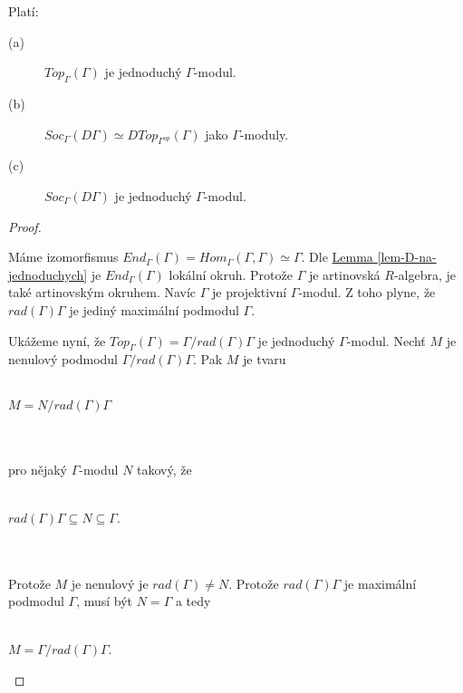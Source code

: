      \begin{lem}\label{lem-soc-top}
       Platí:
       \begin{description}
         \item[(a)] $Top_\Gamma(\Gamma)$ je jednoduchý $\Gamma$-modul. 
         \item[(b)] $Soc_\Gamma(D\Gamma)\simeq DTop_{\Gamma^{op}}(\Gamma)$ jako 
         $\Gamma$-moduly.
         \item[(c)] $Soc_\Gamma(D\Gamma)$ je jednoduchý $\Gamma$-modul.
       \end{description} 
     \end{lem}
     
     \begin{proof}
       \begin{description}
         \item
         \item[(a)] Máme izomorfismus $End_\Gamma(\Gamma)=Hom_\Gamma(\Gamma,\Gamma)\simeq 
           \Gamma$. Dle \hyperref[lem-D-na-jednoduchych]{Lemma \ref*{lem-D-na-jednoduchych}} 
           je $End_\Gamma(\Gamma)$ lokální okruh. Protože $\Gamma$ je artinovská 
           $R$-algebra, je také artinovským okruhem. Navíc $\Gamma$ je 
           projektivní $\Gamma$-modul. Z toho plyne, že $rad(\Gamma)\Gamma$ je 
           jediný maximální podmodul $\Gamma$.
           
           Ukážeme nyní, že $Top_\Gamma(\Gamma)=\Gamma/rad(\Gamma)\Gamma$ je 
           jednoduchý $\Gamma$-modul. Nechť $M$ je nenulový podmodul 
           $\Gamma/rad(\Gamma)\Gamma$. Pak $M$ je tvaru \\\\
           \centerline{$M=N/rad(\Gamma)\Gamma$} \\\\
           pro nějaký $\Gamma$-modul $N$ takový, že \\\\
           \centerline{$rad(\Gamma)\Gamma\subseteq N\subseteq \Gamma$.}\\\\
           Protože $M$ je nenulový je $rad(\Gamma)\neq N$. Protože $rad(\Gamma)\Gamma$ 
           je maximální podmodul $\Gamma$, musí být $N=\Gamma$ a tedy \\\\
           \centerline{$M=\Gamma/rad(\Gamma)\Gamma$.}
           

\end{description}
\end{proof}
